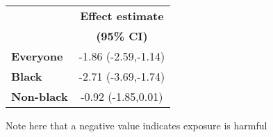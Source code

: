 \begin{table}
\begin{tabular}{lc}\hline
      & \textbf{Effect estimate} \\
      & \textbf{(95\% CI)} \\\hline
\textbf{Everyone} & -1.86 (-2.59,-1.14) \\
\textbf{Black} & -2.71 (-3.69,-1.74) \\
\textbf{Non-black} & -0.92 (-1.85,0.01) \\\hline
\end{tabular}

Note here that a negative value indicates exposure is harmful
\end{table}